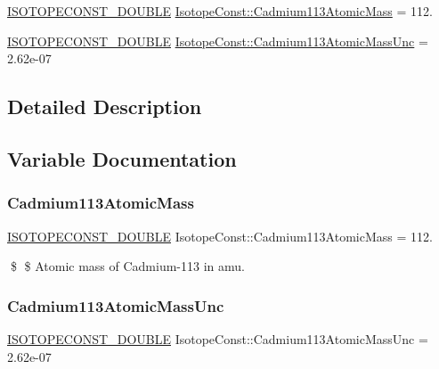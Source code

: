 \begin{DoxyCompactItemize}
\item 
\mbox{\hyperlink{group___isotope_const-_macros_ga8f45a7272ce02c0b4c65c44636ed719a}{I\+S\+O\+T\+O\+P\+E\+C\+O\+N\+S\+T\+\_\+\+D\+O\+U\+B\+LE}} \mbox{\hyperlink{group___isotope_const-_cadmium-_cd113_ga8cb0ac20eb94ce9a4704727bd6cf1844}{Isotope\+Const\+::\+Cadmium113\+Atomic\+Mass}} = 112.
\item 
\mbox{\hyperlink{group___isotope_const-_macros_ga8f45a7272ce02c0b4c65c44636ed719a}{I\+S\+O\+T\+O\+P\+E\+C\+O\+N\+S\+T\+\_\+\+D\+O\+U\+B\+LE}} \mbox{\hyperlink{group___isotope_const-_cadmium-_cd113_ga065ae3286d00ab06ced6232575589a02}{Isotope\+Const\+::\+Cadmium113\+Atomic\+Mass\+Unc}} = 2.\+62e-\/07
\end{DoxyCompactItemize}


\subsection{Detailed Description}


\subsection{Variable Documentation}
\mbox{\label{group___isotope_const-_cadmium-_cd113_ga8cb0ac20eb94ce9a4704727bd6cf1844}} 
\subsubsection{\texorpdfstring{Cadmium113\+Atomic\+Mass}{Cadmium113AtomicMass}}
{\footnotesize\ttfamily \mbox{\hyperlink{group___isotope_const-_macros_ga8f45a7272ce02c0b4c65c44636ed719a}{I\+S\+O\+T\+O\+P\+E\+C\+O\+N\+S\+T\+\_\+\+D\+O\+U\+B\+LE}} Isotope\+Const\+::\+Cadmium113\+Atomic\+Mass = 112.}

\$ \$ Atomic mass of Cadmium-\/113 in amu. \mbox{\label{group___isotope_const-_cadmium-_cd113_ga065ae3286d00ab06ced6232575589a02}} 
\subsubsection{\texorpdfstring{Cadmium113\+Atomic\+Mass\+Unc}{Cadmium113AtomicMassUnc}}
{\footnotesize\ttfamily \mbox{\hyperlink{group___isotope_const-_macros_ga8f45a7272ce02c0b4c65c44636ed719a}{I\+S\+O\+T\+O\+P\+E\+C\+O\+N\+S\+T\+\_\+\+D\+O\+U\+B\+LE}} Isotope\+Const\+::\+Cadmium113\+Atomic\+Mass\+Unc = 2.\+62e-\/07}

